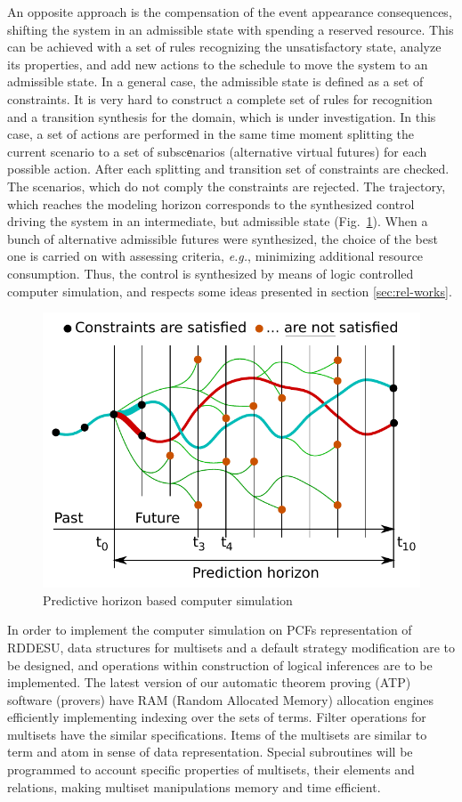 \documentclass[conference]{IEEEtran}
\begin{document}
An opposite approach is the compensation of the event appearance consequences, shifting the system in an admissible state with spending a reserved resource. This can be achieved with a set of rules recognizing the unsatisfactory state, analyze its properties, and add new actions to the schedule to move the system to an admissible state. In a general case, the admissible state is defined as a set of constraints. It is very hard to construct a complete set of rules for recognition and a transition synthesis for the domain, which is under investigation. In this case, a set of actions are performed in the same time moment splitting the current scenario to a set of subscеnarios (alternative virtual futures) for each possible action. After each splitting and transition set of constraints are checked. The scenarios, which do not comply the constraints are rejected. The trajectory, which reaches the modeling horizon corresponds to the synthesized control driving the system in an intermediate, but admissible state (Fig.~\ref{fig:hor}). When a bunch of alternative admissible futures were synthesized, the choice of the best one is carried on with assessing criteria, \emph{e.g.}, minimizing additional resource consumption. Thus, the control is synthesized by means of logic controlled computer simulation, and respects some ideas presented in section \ref{sec:rel-works}.

\begin{figure}[t]
  \centering
  \includegraphics[width=0.7\linewidth]{pics/predictive-horizon.pdf}
  \caption{Predictive horizon based computer simulation}
  \label{fig:hor}
\end{figure}

In order to implement the computer simulation on PCFs representation of RDDESU, data structures for multisets and a default strategy modification are to be designed, and operations within construction of logical inferences are to be implemented.  The latest version of our automatic theorem proving (ATP) software (provers) have RAM (Random Allocated Memory) allocation engines efficiently implementing indexing over the sets of terms. Filter operations for multisets have the similar specifications. Items of the multisets are similar to term and atom in sense of data representation. Special subroutines will be programmed to account specific properties of multisets, their elements and relations, making multiset manipulations memory and time efficient.
\end{document}
